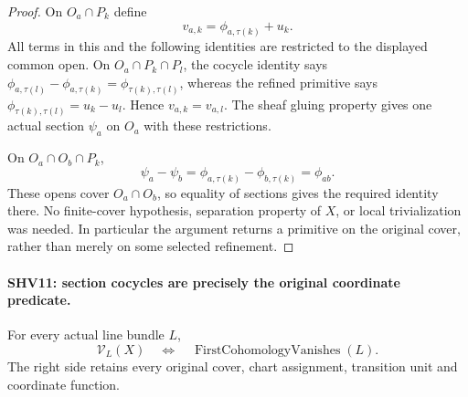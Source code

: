 \begin{proof}
On $O_a\cap P_k$ define
\[
                   v_{a,k}=\phi_{a,\tau(k)}+u_k.
                                                        \tag{SHV.18}
\]
All terms in this and the following identities are restricted
to the displayed common open.  On
$O_a\cap P_k\cap P_l$, the cocycle identity says
$\phi_{a,\tau(l)}-\phi_{a,\tau(k)}
 =\phi_{\tau(k),\tau(l)}$, whereas the refined primitive
says $\phi_{\tau(k),\tau(l)}=u_k-u_l$.
Hence $v_{a,k}=v_{a,l}$.  The sheaf gluing property gives
one actual section $\psi_a$ on $O_a$ with these restrictions.

On $O_a\cap O_b\cap P_k$,
\[
 \psi_a-\psi_b
   =\phi_{a,\tau(k)}-\phi_{b,\tau(k)}
   =\phi_{ab}.
\]
These opens cover $O_a\cap O_b$, so equality of sections gives
the required identity there.  No finite-cover hypothesis,
separation property of $X$, or local trivialization was needed.
In particular the argument returns a primitive on the original
cover, rather than merely on some selected refinement.
\end{proof}

\paragraph{SHV11: section cocycles are precisely the original coordinate predicate.}
\label{claim:SHV11}
For every actual line bundle $L$,
\[
 \mathcal V_L(X)
       \quad\Longleftrightarrow\quad
             \operatorname{FirstCohomologyVanishes}(L).
                                                        \tag{SHV.19}
\]
The right side retains every original cover, chart assignment,
transition unit and coordinate function.

